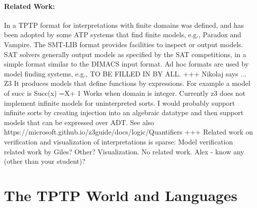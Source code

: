 \documentclass[letterpaper]{article}
\begin{document}
\paragraph{Related Work:}
In \cite{SS+06} a TPTP format for interpretations with finite domains was defined, and has been 
adopted by some ATP systems that find finite models, e.g., Paradox and Vampire.
The SMT-LIB format \cite{BFT17} provides facilities to inspect or output models.  
SAT solvers generally output models as specified by the SAT competitions, in a simple format 
similar to the DIMACS input format.
Ad hoc formats are used by model finding systems, e.g., TO BE FILLED IN BY ALL.
+++
Nikolaj says ...
Z3 It produces models that define functions by expressions. For example a model of succ is 
Succ(x) =X+ 1
Works when domain is integer. Currently z3 does not implement infinite models for uninterpreted sorts. I would probably support infinite sorts by creating injection into an algebraic datatype and then support models that can be expressed over ADT.
See also https://microsoft.github.io/z3guide/docs/logic/Quantifiers
+++
Related work on verification and visualization of interpretations is sparse:
Model verification related work by Giles? Other?
Visualization.
No related work. Alex - know any (other than your student)?


\section{The TPTP World and Languages}
\label{TPTP}
\end{document}
